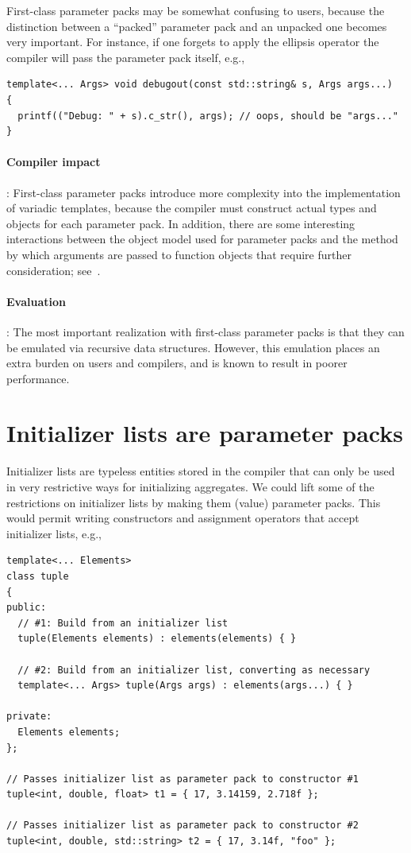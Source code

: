 \documentclass{article}
\begin{document}
First-class parameter packs may be somewhat confusing to users,
because the distinction between a ``packed'' parameter pack and an
unpacked one becomes very important. For instance, if one forgets to
apply the ellipsis operator the compiler will pass the parameter pack
itself, e.g.,
\begin{verbatim}
template<... Args> void debugout(const std::string& s, Args args...)
{
  printf(("Debug: " + s).c_str(), args); // oops, should be "args..."
}
\end{verbatim}

\paragraph{Compiler impact}: First-class parameter packs introduce
more complexity into the implementation of variadic templates, because
the compiler must construct actual types and objects for each
parameter pack. In addition, there are some interesting interactions
between the object model used for parameter packs and the method by
which arguments are passed to function objects that require further
consideration; see~\cite{GJP04a}. 

\paragraph{Evaluation}: The most important realization with
first-class parameter packs is that they can be emulated via recursive
data structures. However, this emulation places an extra burden on
users and compilers, and is known to result in poorer performance.

\section{Initializer lists are parameter packs}
Initializer lists are typeless entities stored in the compiler that
can only be used in very restrictive ways for initializing
aggregates. We could lift some of the restrictions on initializer
lists by making them (value) parameter packs. This would permit writing
constructors and assignment operators that accept initializer lists,
e.g.,

\begin{verbatim}
template<... Elements>
class tuple
{
public:
  // #1: Build from an initializer list
  tuple(Elements elements) : elements(elements) { }

  // #2: Build from an initializer list, converting as necessary
  template<... Args> tuple(Args args) : elements(args...) { }

private:
  Elements elements;
};

// Passes initializer list as parameter pack to constructor #1
tuple<int, double, float> t1 = { 17, 3.14159, 2.718f };
  
// Passes initializer list as parameter pack to constructor #2
tuple<int, double, std::string> t2 = { 17, 3.14f, "foo" };
\end{verbatim}
\end{document}
